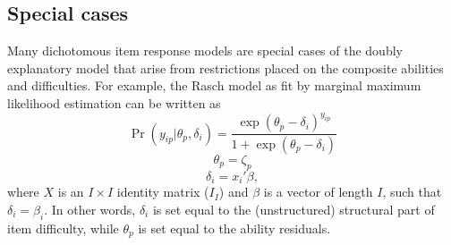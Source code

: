 \documentclass[12pt, letterpaper]{article}
\begin{document}

%


\subsection{Special cases}
\label{sec:special-cases}

Many dichotomous item response models are special cases of the doubly explanatory model that arise from restrictions placed on the composite abilities and difficulties. For example, the Rasch model \parencite{Rasch1960a} as fit by marginal maximum likelihood estimation \parencite{bock1981marginal} can be written as
\begin{equation}
	\Pr ( y_{ip} | \theta_p, \delta_i) =
	\frac {\exp(\theta_p - \delta_i)^{y_{ip}}}
	{1 + \exp(\theta_p - \delta_i)}
\end{equation}
\begin{equation}
	\theta_p = \zeta_p
\end{equation}
\begin{equation}
	\delta_i = x_i' \beta
,\end{equation}
where $X$ is an $I \times I$ identity matrix ($I_I$) and $\beta$ is a vector of length $I$, such that $\delta_i = \beta_i$. In other words, $\delta_i$ is set equal to the (unstructured) structural part of item difficulty, while $\theta_p$ is set equal to the ability residuals.
\end{document}
